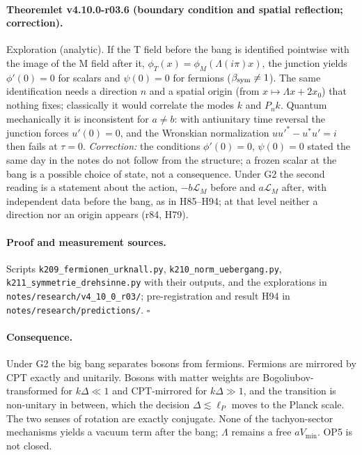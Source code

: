 \paragraph{Theoremlet v4.10.0-r03.6 (boundary condition and spatial reflection; correction).}
Exploration (analytic).  If the T field before the bang is identified pointwise with the image of the M field after it,
\(\phi_T(x)=\phi_M(\Lambda(i\pi)x)\), the junction yields \(\phi'(0)=0\) for scalars and \(\psi(0)=0\) for fermions (\(\beta_{\rm sym}\neq1\)).  The same identification
needs a direction \(n\) and a spatial origin (from \(x\mapsto\Lambda x+2x_0\)) that nothing fixes; classically it would correlate the modes \(k\) and \(P_nk\).
Quantum mechanically it is inconsistent for \(a\neq b\): with antiunitary time reversal the junction forces \(u'(0)=0\), and the Wronskian
normalization \(uu'^*-u^*u'=i\) then fails at \(\tau=0\).  \emph{Correction:} the conditions \(\phi'(0)=0\), \(\psi(0)=0\) stated the same day in the notes do
not follow from the structure; a frozen scalar at the bang is a possible choice of state, not a consequence.  Under G2 the second reading is a
statement about the action, \(-b\mathcal L_M\) before and \(a\mathcal L_M\) after, with independent data before the bang, as in H85--H94; at that level
neither a direction nor an origin appears (r84, H79).

\paragraph{Proof and measurement sources.}
Scripts \texttt{k209\_\allowbreak fermionen\_\allowbreak urknall.py}, \texttt{k210\_\allowbreak norm\_\allowbreak uebergang.py},
\texttt{k211\_\allowbreak symmetrie\_\allowbreak drehsinne.py} with their outputs, and the explorations in \texttt{notes/\allowbreak research/\allowbreak v4\_10\_0\_r03/};
pre-registration and result H94 in \texttt{notes/\allowbreak research/\allowbreak predictions/}.  \(\square\)

\paragraph{Consequence.}
Under G2 the big bang separates bosons from fermions.  Fermions are mirrored by CPT exactly and unitarily.  Bosons with matter weights are
Bogoliubov-transformed for \(k\Delta\ll1\) and CPT-mirrored for \(k\Delta\gg1\), and the transition is non-unitary in between, which the decision
\(\Delta\lesssim\ell_P\) moves to the Planck scale.  The two senses of rotation are exactly conjugate.  None of the tachyon-sector mechanisms yields a
vacuum term after the bang; \(\Lambda\) remains a free \(aV_{\min}\).  OP5 is not closed.

